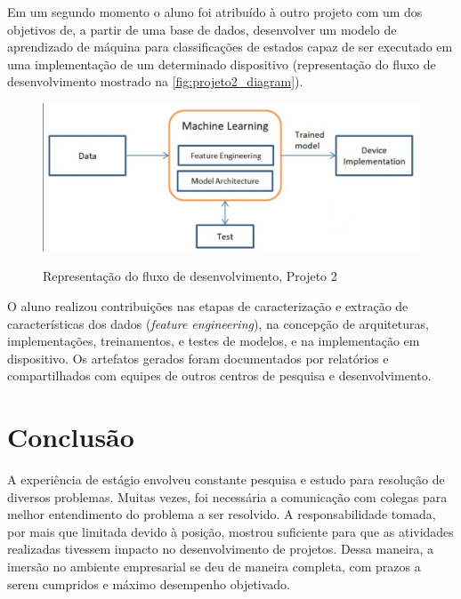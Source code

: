 \documentclass[
	12pt,				%
    oneside,			%
	a4paper,			%
	english,			%
	french,				%
	spanish,			%
	brazil				%
	]{abntex2}
\begin{document}
Em um segundo momento o aluno foi atribuído à outro projeto com um dos objetivos de, a partir de uma base de dados, desenvolver um modelo de aprendizado de máquina para classificações de estados capaz de ser executado em uma implementação de um determinado dispositivo (representação do fluxo de desenvolvimento mostrado na \autoref{fig:projeto2_diagram}).  

\begin{figure}[H] 
  \centering
  \includegraphics[width=400pt]{images/projeto2_diagram.jpg}\\
  \caption[Representação do fluxo de desenvolvimento, Projeto 2]{Representação do fluxo de desenvolvimento, Projeto 2}  \label{fig:projeto2_diagram}
\end{figure}

O aluno realizou contribuições nas etapas de caracterização e extração de características dos dados (\textit{feature engineering}), na concepção de arquiteturas, implementações, treinamentos, e testes de modelos, e na implementação em dispositivo. Os artefatos gerados foram documentados por relatórios e compartilhados com equipes de outros centros de pesquisa e desenvolvimento.

\chapter{Conclusão}

A experiência de estágio envolveu constante pesquisa e estudo para resolução de diversos problemas. Muitas vezes, foi necessária a comunicação com colegas para melhor entendimento do problema a ser resolvido. A responsabilidade tomada, por mais que limitada devido à posição, mostrou suficiente para que as atividades realizadas tivessem impacto no desenvolvimento de projetos. Dessa maneira, a imersão no ambiente empresarial se deu de maneira completa, com prazos a serem cumpridos e máximo desempenho objetivado.
\end{document}

